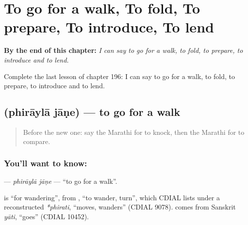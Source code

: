 
\chapter{To go for a walk, To fold, To prepare, To introduce, To lend}
\label{ch:mr-to-go-for-a-walk-to-fold-to-prepare-to-introduce-to-lend}

\begin{chapteropening}
\textbf{By the end of this chapter:} \emph{I can say to go for a walk, to fold, to prepare, to introduce and to lend.}

Complete the last lesson of chapter 196: I can say to go for a walk, to fold, to prepare, to introduce and to lend.
\end{chapteropening}

\section[\texorpdfstring{\mr{फिरायला} \mr{जाणे} (phirāylā jāṇe)}{फिरायला जाणे (phirāylā jāṇe)}]{  (phirāylā jāṇe) — to go for a walk}

\label{lesson:MR-C196-phirayla-jane}



\begin{quote}
Before the new one: say the Marathi for to knock, then the Marathi for to compare.
\end{quote}

\subsection*{You'll want to know:  }
\textbf{ } — \emph{phirāylā jāṇe} — \textquotedblleft{}to go for a walk\textquotedblright{}.

\begin{cousinweb}
\textbf{} is \textquotedblleft{}for wandering\textquotedblright{}, from \textbf{}, \textquotedblleft{}to wander, turn\textquotedblright{}, which CDIAL lists under a reconstructed \emph{*phirati}, \textquotedblleft{}moves, wanders\textquotedblright{} (CDIAL 9078). \textbf{} comes from Sanskrit \emph{yāti}, \textquotedblleft{}goes\textquotedblright{} (CDIAL 10452).
\end{cousinweb}


